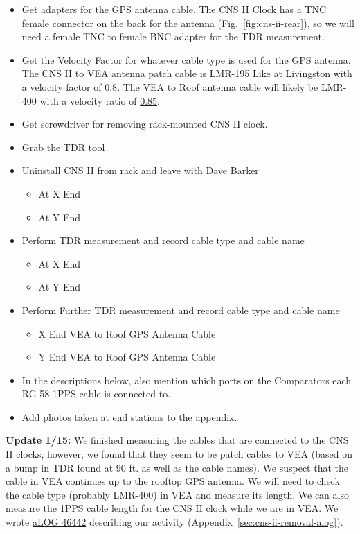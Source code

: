\documentclass{article}
\newcommand*{\TODO}{\textcolor{todo}}
\begin{document}
\begin{itemize}
    \item{Get adapters for the GPS antenna cable. The CNS II Clock has a TNC female connector on the back for the antenna (Fig.~\ref{fig:cns-ii-rear}), so we will need a female TNC to female BNC adapter for the TDR measurement.}
    \item{Get the Velocity Factor for whatever cable type is used for the GPS antenna.} The CNS II to VEA antenna patch cable is LMR-195 Like at Livingston with a velocity factor of \href{https://www.pasternack.com/50-ohm-low-loss-flexible-lmr195-pe-jacket-double-shielded-black-lmr-195-p.aspx}{0.8}. The VEA to Roof antenna cable will likely be LMR-400 with a velocity ratio of \href{https://www.febo.com/reference/cable_data.html}{0.85}. 
    \item{Get screwdriver for removing rack-mounted CNS II clock.}
    \item{Grab the TDR tool}
    \item{Uninstall CNS II from rack and leave with Dave Barker}
    \begin{itemize}
        \item At X End
        \item At Y End
    \end{itemize}
    \item{Perform TDR measurement and record cable type and cable name}
    \begin{itemize}
        \item At X End
        \item At Y End
    \end{itemize}
    \item{Perform Further TDR measurement and record cable type and cable name}
    \begin{itemize}
        \item \TODO{X End VEA to Roof GPS Antenna Cable}
        \item \TODO{Y End VEA to Roof GPS Antenna Cable}
    \end{itemize}
    \item{\TODO{In the descriptions below, also mention which ports on the Comparators each RG-58 1PPS cable is connected to.}}
    \item \TODO{Add photos taken at end stations to the appendix.}
\end{itemize}

\textbf{Update 1/15:} We finished measuring the cables that are connected to the CNS II clocks, however, we found that they seem to be patch cables to VEA (based on a bump in TDR found at 90 ft. as well as the cable names). We suspect that the cable in VEA continues up to the rooftop GPS antenna. \TODO{We will need to check the cable type (probably LMR-400) in VEA and measure its length}. We can also measure the 1PPS cable length for the CNS II clock while we are in VEA. We wrote \href{https://alog.ligo-wa.caltech.edu/aLOG/index.php?callRep=46442}{aLOG 46442} describing our activity (Appendix~\ref{sec:cns-ii-removal-alog}).
\end{document}
